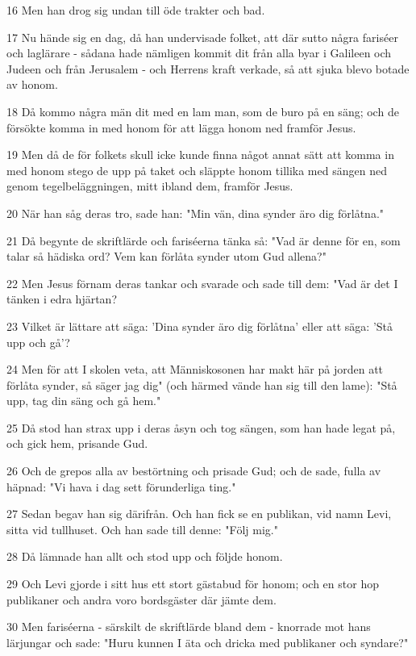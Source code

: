 \par 16 Men han drog sig undan till öde trakter och bad.
\par 17 Nu hände sig en dag, då han undervisade folket, att där sutto några fariséer och laglärare - sådana hade nämligen kommit dit från alla byar i Galileen och Judeen och från Jerusalem - och Herrens kraft verkade, så att sjuka blevo botade av honom.
\par 18 Då kommo några män dit med en lam man, som de buro på en säng; och de försökte komma in med honom för att lägga honom ned framför Jesus.
\par 19 Men då de för folkets skull icke kunde finna något annat sätt att komma in med honom stego de upp på taket och släppte honom tillika med sängen ned genom tegelbeläggningen, mitt ibland dem, framför Jesus.
\par 20 När han såg deras tro, sade han: "Min vän, dina synder äro dig förlåtna."
\par 21 Då begynte de skriftlärde och fariséerna tänka så: "Vad är denne för en, som talar så hädiska ord? Vem kan förlåta synder utom Gud allena?"
\par 22 Men Jesus förnam deras tankar och svarade och sade till dem: "Vad är det I tänken i edra hjärtan?
\par 23 Vilket är lättare att säga: 'Dina synder äro dig förlåtna' eller att säga: 'Stå upp och gå'?
\par 24 Men för att I skolen veta, att Människosonen har makt här på jorden att förlåta synder, så säger jag dig" (och härmed vände han sig till den lame): "Stå upp, tag din säng och gå hem."
\par 25 Då stod han strax upp i deras åsyn och tog sängen, som han hade legat på, och gick hem, prisande Gud.
\par 26 Och de grepos alla av bestörtning och prisade Gud; och de sade, fulla av häpnad: "Vi hava i dag sett förunderliga ting."
\par 27 Sedan begav han sig därifrån. Och han fick se en publikan, vid namn Levi, sitta vid tullhuset. Och han sade till denne: "Följ mig."
\par 28 Då lämnade han allt och stod upp och följde honom.
\par 29 Och Levi gjorde i sitt hus ett stort gästabud för honom; och en stor hop publikaner och andra voro bordsgäster där jämte dem.
\par 30 Men fariséerna - särskilt de skriftlärde bland dem - knorrade mot hans lärjungar och sade: "Huru kunnen I äta och dricka med publikaner och syndare?"
